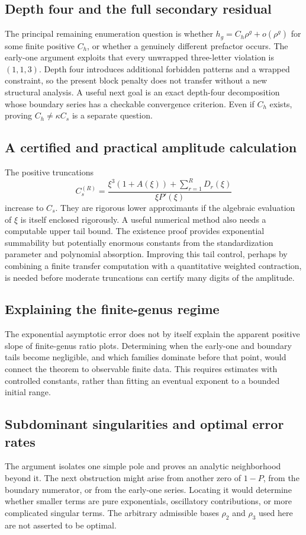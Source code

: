\documentclass[11pt,letterpaper]{article}
\theoremstyle{definition}
\begin{document}
\subsection{Depth four and the full secondary residual}
The principal remaining enumeration question is whether $h_g=C_h\rho^g+o(\rho^g)$ for some finite positive $C_h$, or whether a genuinely different prefactor occurs. The early-one argument exploits that every unwrapped three-letter violation is $(1,1,3)$. Depth four introduces additional forbidden patterns and a wrapped constraint, so the present block penalty does not transfer without a new structural analysis. A useful next goal is an exact depth-four decomposition whose boundary series has a checkable convergence criterion. Even if $C_h$ exists, proving $C_h\ne\kappa C_s$ is a separate question.

\subsection{A certified and practical amplitude calculation}
The positive truncations
\[
C_s^{(R)}=\frac{\xi^3(1+A(\xi))+\sum_{r=1}^{R}D_r(\xi)}
{\xi P'(\xi)}
\]
increase to $C_s$. They are rigorous lower approximants if the algebraic evaluation of $\xi$ is itself enclosed rigorously. A useful numerical method also needs a computable upper tail bound. The existence proof provides exponential summability but potentially enormous constants from the standardization parameter and polynomial absorption. Improving this tail control, perhaps by combining a finite transfer computation with a quantitative weighted contraction, is needed before moderate truncations can certify many digits of the amplitude.

\subsection{Explaining the finite-genus regime}
The exponential asymptotic error does not by itself explain the apparent positive slope of finite-genus ratio plots. Determining when the early-one and boundary tails become negligible, and which families dominate before that point, would connect the theorem to observable finite data. This requires estimates with controlled constants, rather than fitting an eventual exponent to a bounded initial range.

\subsection{Subdominant singularities and optimal error rates}
The argument isolates one simple pole and proves an analytic neighborhood beyond it. The next obstruction might arise from another zero of $1-P$, from the boundary numerator, or from the early-one series. Locating it would determine whether smaller terms are pure exponentials, oscillatory contributions, or more complicated singular terms. The arbitrary admissible bases $\rho_2$ and $\rho_3$ used here are not asserted to be optimal.
\end{document}
